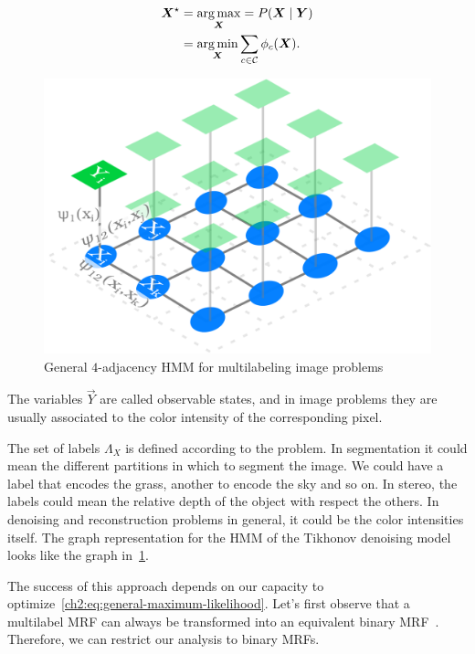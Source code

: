 \begin{align}
	\bm{X}^{\star} &= \operatorname*{arg\,max}_{\bm{X}} = P(\bm{X} \; | \; \bm{Y}) \nonumber \\
	&= \operatorname*{arg\,min}_{\bm{X}}{ \sum_{c \in \mathcal{C}}{\phi_c(\bm{X})}}.
	\label{ch2:eq:general-maximum-likelihood}
\end{align}

\begin{figure}
\center
\includegraphics[scale=0.10]{figures/chapter3/hmm-example.png}
\caption{General $4$-adjacency HMM for multilabeling image problems}
\label{ch2:fig:hmm-multilabeling}
\end{figure}

 The variables $\vec{Y}$ are called observable states, and in image problems they are usually associated to the color intensity of the corresponding pixel. 

The set of labels $\Lambda_X$ is defined according to the problem. In segmentation it could mean the different partitions in which to segment the image. We could have a label that encodes the grass, another to encode the sky and so on. In stereo, the labels could mean the relative depth of the object with respect the others. In denoising and reconstruction problems in general, it could be the color intensities itself. The graph representation for the HMM of the Tikhonov denoising model looks like the graph in~\cref{ch2:fig:hmm-multilabeling}.

The success of this approach depends on our capacity to optimize~\cref{ch2:eq:general-maximum-likelihood}. Let's first observe that a multilabel MRF can always be transformed into an equivalent binary MRF~\cite{ishikawa10}. Therefore, we can restrict our analysis to binary MRFs.

